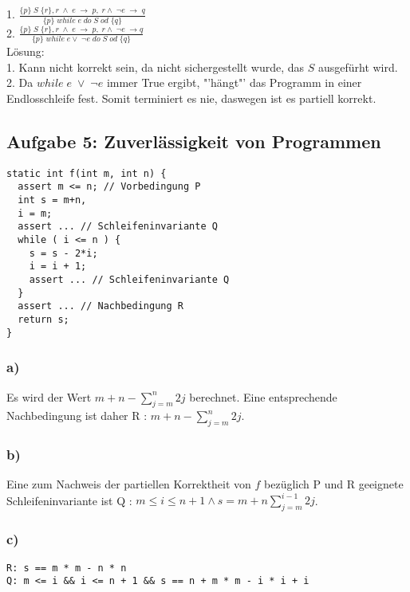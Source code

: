 \documentclass[a4paper, 10pt]{article}
\begin{document}
1. $\frac{\{p\}\;S\; \{r\}, r\; \wedge \;e \;\to \;p, \;r \wedge \;\neg e \;\to \;q}{\{p\} \;while\;e\;do\;S\;od\;\{q\}}$
\\

2. $\frac{\{p\}\;S\; \{r\}, r\; \wedge \;e\; \to\; p, \;r \wedge \;\neg e  \;\to q}{\{p\} \;while\;e \vee\; \neg e\;do\;S\;od\;\{q\}}$
\\

Lösung:\\

1. Kann nicht korrekt sein, da nicht sichergestellt wurde, das $S$ ausgefürht wird.\\

2. Da $while\; e \; \vee \; \neg e$ immer True ergibt, "'hängt"' das Programm in einer Endlosschleife fest. Somit terminiert es nie, daswegen ist es partiell korrekt. 

\subsection*{Aufgabe 5: Zuverlässigkeit von Programmen}

\begin{lstlisting}
static int f(int m, int n) {
  assert m <= n; // Vorbedingung P
  int s = m+n,
  i = m;
  assert ... // Schleifeninvariante Q
  while ( i <= n ) {
    s = s - 2*i;
    i = i + 1;
    assert ... // Schleifeninvariante Q
  }
  assert ... // Nachbedingung R
  return s;
}
\end{lstlisting}

\subsubsection*{a)}
Es wird der Wert $m+n-\sum^n_{j=m}2j$ berechnet. Eine entsprechende
Nachbedingung ist daher R : $m+n-\sum^n_{j=m}2j$.
\subsubsection*{b)}
Eine zum Nachweis der partiellen Korrektheit von $f$ bezüglich P und R geeignete
Schleifeninvariante ist Q : $m \leq i \leq n + 1 \wedge s = m + n \sum^{i - 1}_{j = m}2j$.
\subsubsection*{c)}
\begin{lstlisting}
R: s == m * m - n * n
Q: m <= i && i <= n + 1 && s == n + m * m - i * i + i
\end{lstlisting}
\end{document}
